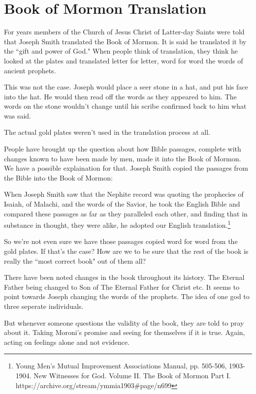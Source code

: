 \chapter{Book of Mormon Translation}

For years members of the Church of Jesus Christ of Latter-day Saints were told that
Joseph Smith translated the Book of Mormon. It is said he translated it by the ``gift
and power of God." When people think of translation, they think he looked at the
plates and translated letter for letter, word for word the words of ancient prophets.

This was not the case. Joseph would place a seer stone in a hat, and put his face
into the hat. He would then read off the words as they appeared to him. The words on
the stone wouldn't change until his scribe confirmed back to him what was said.

The actual gold plates weren't used in the translation process at all.

People have brought up the question about how Bible passages, complete with changes
known to have been made by men, made it into the Book of Mormon. We have a possible
explaination for that. Joseph Smith copied the passages from the Bible into the 
Book of Mormon:

\begin{displayquote}
When Joseph Smith saw that the Nephite record was quoting the prophecies of Isaiah, 
of Malachi, and the words of the Savior, he took the English Bible and compared these 
passages as far as they paralleled each other, and finding that in substance in 
thought, they were alike, he adopted our English 
translation.\footnote{Young Men's Mutual Improvement Associations Manual, pp.
505-506, 1903-1904. New Witnesses for God. Volume II. The Book of Mormon Part I.
https://archive.org/stream/ymmia1903\#page/n699}
\end{displayquote}

So we're not even sure we have those passages copied word for word from the gold
plates. If that's the case? How are we to be sure that the rest of the book is really
the ``most correct book" out of them all?

There have been noted changes in the book throughout its history. The Eternal Father
being changed to Son of The Eternal Father for Christ etc. It seems to point towards
Joseph changing the words of the prophets. The idea of one god to three seperate
individuals.

But whenever someone questions the validity of the book, they are told to pray about
it. Taking Moroni's promise and seeing for themselves if it is true. Again, acting on
feelings alone and not evidence.

